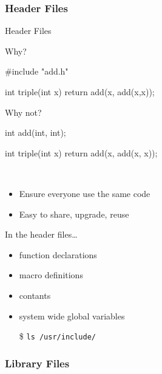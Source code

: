 \subsubsection{Header Files}
\label{sec:header-files}

\begin{frame}[fragile]{Header Files}
  \begin{minipage}{.45\linewidth}
    \begin{block}{Why?}
\begin{ccode}
#include "add.h"

int triple(int x)
{
  return add(x, add(x,x));
}
\end{ccode}
    \end{block}
  \end{minipage}\qquad
  \begin{minipage}{.45\linewidth}
    \begin{block}{Why not?}
\begin{ccode}
int add(int, int);

int triple(int x)
{
  return add(x, add(x, x));
}
\end{ccode}
    \end{block}
  \end{minipage}\\[1ex]
  \begin{itemize}
  \item Ensure everyone use the same code
  \item Easy to share, upgrade, reuse
  \end{itemize}
  \begin{block}{In the header files\ldots}
    \begin{multicols}{2}
      \begin{itemize}
      \item function declarations
      \item macro definitions
      \item contants
      \item system wide global variables
      \end{itemize}
    \end{multicols}
  \end{block}
  \begin{itemize}
  \item[\$] \texttt{ls /usr/include/}
  \end{itemize}
\end{frame}

\subsubsection{Library Files}
\label{sec:library-files}

